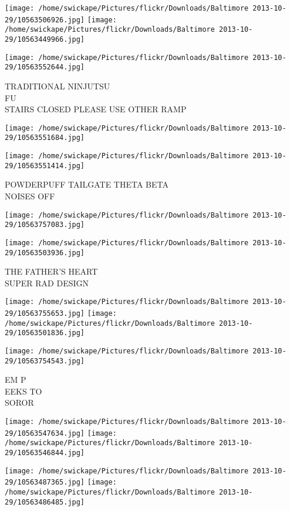 \documentclass[10pt,letterpaper]{article}
\begin{document}
\texttt{[image: /home/swickape/Pictures/flickr/Downloads/Baltimore 2013-10-29/10563506926.jpg]}
\texttt{[image: /home/swickape/Pictures/flickr/Downloads/Baltimore 2013-10-29/10563449966.jpg]}

\texttt{[image: /home/swickape/Pictures/flickr/Downloads/Baltimore 2013-10-29/10563552644.jpg]}

TRADITIONAL NINJUTSU\\
FU\\
STAIRS CLOSED PLEASE USE OTHER RAMP
\pagebreak

\texttt{[image: /home/swickape/Pictures/flickr/Downloads/Baltimore 2013-10-29/10563551684.jpg]}

\vspace{0.25in}
\texttt{[image: /home/swickape/Pictures/flickr/Downloads/Baltimore 2013-10-29/10563551414.jpg]}

POWDERPUFF TAILGATE THETA BETA\\
NOISES OFF
\pagebreak

\texttt{[image: /home/swickape/Pictures/flickr/Downloads/Baltimore 2013-10-29/10563757083.jpg]}

\vspace{0.25in}
\texttt{[image: /home/swickape/Pictures/flickr/Downloads/Baltimore 2013-10-29/10563503936.jpg]}

THE FATHER'S HEART\\
SUPER RAD DESIGN
\pagebreak

\texttt{[image: /home/swickape/Pictures/flickr/Downloads/Baltimore 2013-10-29/10563755653.jpg]}
\texttt{[image: /home/swickape/Pictures/flickr/Downloads/Baltimore 2013-10-29/10563501836.jpg]}

\vspace{0.25in}
\texttt{[image: /home/swickape/Pictures/flickr/Downloads/Baltimore 2013-10-29/10563754543.jpg]}

EM P\\
EEKS TO\\
SOROR
\pagebreak

\texttt{[image: /home/swickape/Pictures/flickr/Downloads/Baltimore 2013-10-29/10563547634.jpg]}
\texttt{[image: /home/swickape/Pictures/flickr/Downloads/Baltimore 2013-10-29/10563546844.jpg]}

\texttt{[image: /home/swickape/Pictures/flickr/Downloads/Baltimore 2013-10-29/10563487365.jpg]}
\texttt{[image: /home/swickape/Pictures/flickr/Downloads/Baltimore 2013-10-29/10563486485.jpg]}
\end{document}
